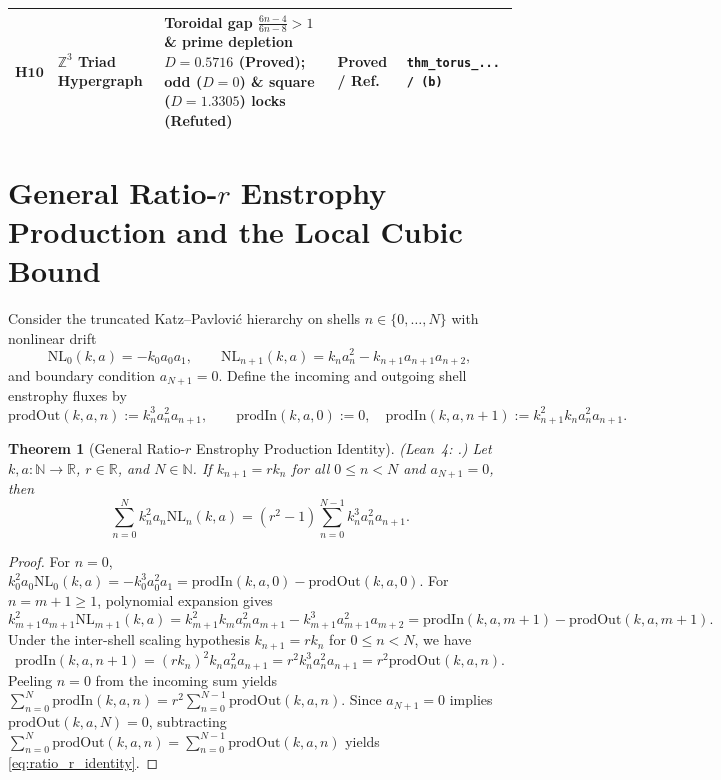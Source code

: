 \documentclass[11pt,a4paper]{article}
\newtheorem{theorem}{Theorem}[section]
\theoremstyle{definition}
\theoremstyle{remark}
\begin{document}
\begin{table}[ht!]
{\begin{tabular}{@{}llp{5.8cm}ll@{}}
$\mathbf{H10}$ & $\mathbb{Z}^3$ Triad Hypergraph & Toroidal gap $\frac{6n-4}{6n-8}>1$ \& prime depletion $D=0.5716$ (\textbf{Proved}); odd ($D=0$) \& square ($D=1.3305$) locks (\textbf{Refuted}) & \textcolor{green!45!black}{\textbf{Proved}} / \textcolor{red!70!black}{\textbf{Ref.}} & \texttt{thm\_torus\_... / (b)} \\
\bottomrule
\end{tabular}%
}
\end{table}

\section{General Ratio-$r$ Enstrophy Production and the Local Cubic Bound}

Consider the truncated Katz--Pavlovi\'c hierarchy on shells $n \in \{0, \dots, N\}$ with nonlinear drift
\begin{equation}\label{eq:nl_def}
\mathrm{NL}_0(k,a) = -k_0 a_0 a_1, \qquad \mathrm{NL}_{n+1}(k,a) = k_n a_n^2 - k_{n+1} a_{n+1} a_{n+2},
\end{equation}
and boundary condition $a_{N+1} = 0$. Define the incoming and outgoing shell enstrophy fluxes by
\begin{equation}\label{eq:flux_defs}
\mathrm{prodOut}(k,a,n) := k_n^3 a_n^2 a_{n+1}, \qquad
\mathrm{prodIn}(k,a,0) := 0, \quad \mathrm{prodIn}(k,a,n+1) := k_{n+1}^2 k_n a_n^2 a_{n+1}.
\end{equation}

\begin{theorem}[General Ratio-$r$ Enstrophy Production Identity]\label{thm:ratio_r}
\emph{(Lean~4: .)} Let $k, a : \mathbb{N} \to \mathbb{R}$, $r \in \mathbb{R}$, and $N \in \mathbb{N}$. If $k_{n+1} = r k_n$ for all $0 \le n < N$ and $a_{N+1} = 0$, then
\begin{equation}\label{eq:ratio_r_identity}
\sum_{n=0}^{N} k_n^2 a_n \mathrm{NL}_n(k,a) = \mbox{$(r^2 - 1)$} \sum_{n=0}^{N-1} k_n^3 a_n^2 a_{n+1}.
\end{equation}
\end{theorem}
\begin{proof}
For $n=0$, $k_0^2 a_0 \mathrm{NL}_0(k,a) = -k_0^3 a_0^2 a_1 = \mathrm{prodIn}(k,a,0) - \mathrm{prodOut}(k,a,0)$. For $n = m+1 \ge 1$, polynomial expansion gives
\[
k_{m+1}^2 a_{m+1} \mathrm{NL}_{m+1}(k,a) = k_{m+1}^2 k_m a_m^2 a_{m+1} - k_{m+1}^3 a_{m+1}^2 a_{m+2} = \mathrm{prodIn}(k,a,m+1) - \mathrm{prodOut}(k,a,m+1).
\]
Under the inter-shell scaling hypothesis $k_{n+1} = r k_n$ for $0 \le n < N$, we have
\[
\mathrm{prodIn}(k,a,n+1) = (r k_n)^2 k_n a_n^2 a_{n+1} = r^2 k_n^3 a_n^2 a_{n+1} = r^2 \mathrm{prodOut}(k,a,n).
\]
Peeling $n=0$ from the incoming sum yields $\sum_{n=0}^N \mathrm{prodIn}(k,a,n) = r^2 \sum_{n=0}^{N-1} \mathrm{prodOut}(k,a,n)$. Since $a_{N+1}=0$ implies $\mathrm{prodOut}(k,a,N)=0$, subtracting $\sum_{n=0}^N \mathrm{prodOut}(k,a,n) = \sum_{n=0}^{N-1} \mathrm{prodOut}(k,a,n)$ yields \eqref{eq:ratio_r_identity}.
\end{proof}
\end{document}
